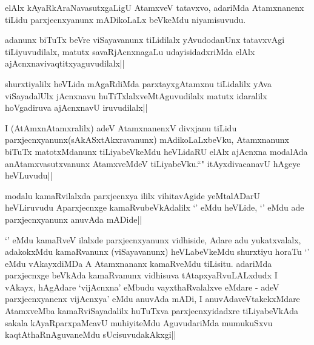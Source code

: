 
\begin{artha}
elAlx kAyaRkAraNavasutxgaLigU AtamxveV tatavxvo, adariMda Atamxnanenx tiLidu parxjecnxyanunx mADikoLaLx beVkeMdu niyamisuvudu.
\end{artha}

\begin{artha}
adanunx biTuTx beVre viSayavanunx tiLidilalx yAvudodanUnx tatavxvAgi tiLiyuvudilalx, matutx savaRjAcnxnagaLu udayisidadxriMda elAlx ajAcnxnavivaqtitxyaguvudilalx||
\end{artha}


\begin{artha}
shurxtiyalilx heVLida mAgaRdiMda parxtayxgAtamxnu tiLidalilx yAva viSayadalUlx jAcnxnavu huTiTxlalxveMtAguvudilalx matutx idaralilx hoVgadiruva ajAcnxnavU iruvudilalx||
\end{artha}


\begin{artha}
I (AtAmxnAtamxralilx) adeV AtamxnanenxV divxjanu tiLidu parxjecnxyanunx(sAkASxtAkxravanunx) mAdikoLaLxbeVku, Atamxnanunx biTuTx matotxMdanunx tiLiyabeVkeMdu heVLidaRU elAlx ajAcnxna modalAda anAtamxvasutxvanunx AtamxveMdeV tiLiyabeVku.``\stext" itAyxdivacanavU hAgeye heVLuvudu||
\end{artha}


\begin{artha}
modalu kamaRvilalxda parxjecnxya ililx vihitavAgide yeMtalADarU heVLiruvudu Aparxjecnxge kamaRvubeVkAdalilx `\stext' eMdu heVLide, `\stext' eMdu ade parxjecnxyanunx anuvAda mADide||
\end{artha}


\begin{artha}
`\stext' eMdu kamaRveV ilalxde parxjecnxyanunx vidhiside, Adare adu yukatxvalalx, adakokxMdu kamaRvanunx (viSayavanunx) heVLabeVkeMdu shurxtiyu horaTu `\stext' eMdu vAkayxdiMDa A Atamxnananx kamaRveMdu tiLisitu. adariMda parxjecnxge beVkAda kamaRvanunx vidhisuva tAtapxyaRvuLALxdudx I vAkayx, hAgAdare `vijAcnxna' eMbudu vayxthaRvalalxve eMdare - adeV parxjecnxyanenx vijAcnxya' eMdu anuvAda mADi, I anuvAdaveVtakekxMdare AtamxveMba kamaRviSayadalilx huTuTxva parxjecnxyidadxre tiLiyabeVkAda sakala kAyaRparxpaMcavU muhiyiteMdu AguvudariMda mumukuSxvu kaqtAthaRnAguvaneMdu sUcisuvudakAkxgi||
\end{artha}

